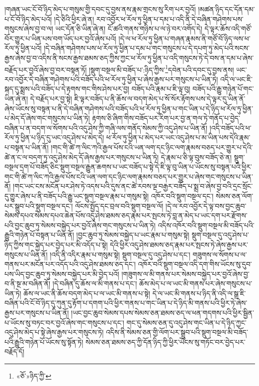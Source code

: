 །གཞན་ཡང་ངོ་བོ་ཉིད་མེད་པ་གསུམ་གྱི་དབང་དུ་བྱས་ནས་རྣམ་གྲངས་སུ་རིག་པར་བྱའོ། །མཚན་ཉིད་དང་དོན་དམ་པ་ངོ་བོ་ཉིད་མེད་པའོ། །དེ་ཅིའི་ཕྱིར་ཞེ་ན། རབ་འབྱོར་ཕ་རོལ་ཏུ་ཕྱིན་པ་དམ་པ་འདི་ནི་དེ་བཞིན་གཤེགས་པས་གསུངས་ཞེས་བྱ་བ་ལ། ཡང་དོན་ཅི་ཡིན་ཞེ་ན། ངོ་ཚའི་གནས་གཉིས་པ་ལ་ཉེ་བར་འགོད་དེ། དེ་ལྟར་ཆོས་འདི་གཙོ་བོར་གྱུར་པ་ཡིན་པས་བག་ཡོད་པར་བྱའོ་ཞེས་པའོ། །དེ་ལ་ཕ་རོལ་ཏུ་ཕྱིན་པ་གཞན་རྣམས་ནི་གཙོ་བོ་ཉིད་ལས་ཕ་རོལ་ཏུ་ཕྱིན་པའོ། །དེ་བཞིན་གཤེགས་པས་ཕ་རོལ་ཏུ་ཕྱིན་པ་དམ་པ་གང་གསུངས་པ་དེ་དཔག་ཏུ་མེད་པའི་སངས་རྒྱས་ཞེས་བྱ་བ་འདིས་ནི་སངས་རྒྱས་ཐམས་ཅད་ཀྱིས་ཀྱང་ཕ་རོལ་ཏུ་ཕྱིན་པ་འདི་གསུངས་ཏེ་དེ་བས་ན་དམ་པ་ཞེས་བརྗོད་པར་བྱའོ་ཞེས་བྱ་བར་བསྟན་ཏོ། །སྡུག་བསྔལ་མི་བཟོད་པ་:ཉིད་ཀྱིས་\footnote{«ཅོ་»ཉིད་ཀྱི་}དབེན་པའི་དབང་དུ་བྱས་ནས། ཡང་རབ་འབྱོར་དེ་བཞིན་གཤེགས་པའི་བཟོད་པའི་ཕ་རོལ་ཏུ་ཕྱིན་པ་ཞེས་རྒྱས་པར་གསུངས་པ་ཡིན་ཏེ། འདི་ལ་ཡང་ཇི་སྐད་དུ་སྨྲས་པའི་བཟོད་པ་དེ་རྟགས་གང་གིས་ཤེས་པར་བྱ། བཟོད་པའི་རྣམ་པ་ཇི་ལྟ་བུ། བཟོད་པའི་རྒྱུ་གཉེན་པོ་གང་ཡིན་ཞེ་ན། དེ་བརྗོད་པར་བྱ་སྟེ། ཇི་ལྟར་བཟོད་པ་ནི་ཆོས་ལ་བདག་མེད་པ་སོ་སོར་རྟོགས་པས་དེ་ལྟར་དུ་ཡིན་ནོ་ཞེས་ཡོངས་སུ་བསྟན་པ་ནི་དེ་བཞིན་གཤེགས་པའི་བཟོད་པའི་ཕ་རོལ་ཏུ་ཕྱིན་པ་གང་ཡིན་པ་དེ་ཉིད་ཕ་རོལ་ཏུ་ཕྱིན་པ་མེད་དོ་ཞེས་གང་གསུངས་པ་ཡིན་ཏེ། རྟགས་ཅི་ཞིག་གིས་བཟོད་པར་རིག་པར་བྱ་ན་གལ་ཏེ་གནོད་པ་བྱེད་བཞིན་པ་ན་བདག་ལ་སོགས་པའི་འདུ་ཤེས་ཀྱི་གཞི་ལས་གནོད་སེམས་ཀྱི་འདུ་ཤེས་པ་ཡིན་ནོ། །འདི་བཟོད་པའི་ཕ་རོལ་ཏུ་ཕྱིན་པ་ཉིད་དུ་ཡང་འདུ་ཤེས་པ་མེད་དེ། ཕ་རོལ་ཏུ་ཕྱིན་པ་མེད་པར་ཡང་འདུ་ཤེས་པ་མ་ཡིན་པས་དེའི་རྣམ་པ་བསྟན་པ་ཡིན་ནོ། །གང་གི་ཚེ་ཀ་ལིང་ཀའི་རྒྱལ་པོས་ངའི་ཡན་ལག་དང་ཉིང་ལག་རྣམས་བཅད་པར་གྱུར་པ་དེའི་ཚེ་ན་ང་ལ་བདག་ཏུ་འདུ་ཤེས་མེད་དོ་ཞེས་རྒྱས་པར་གསུངས་པ་ཡིན་ཏེ། དེ་རྣམ་པ་ཅི་ལྟ་བུས་བཟོད་ཅེ་ན། སྡུག་བསྔལ་དྲག་པོ་བཟོད་ཅིང་སྡུག་བསྔལ་རྒྱུན་ཆགས་པ་ཡང་བཟོད་པ་སྟེ་དེ་ཇི་ལྟ་བུ་ཡིན་པ་ཡོངས་སུ་བསྟན་པའི་ཕྱིར་གང་གི་ཚེ་ཀ་ལིང་ཀའི་རྒྱལ་པོས་ངའི་ཡན་ལག་དང་ཉིང་ལག་རྣམས་བཅད་པར་གྱུར་པ་ཞེས་གང་གསུངས་པ་ཡིན་ནོ། །གང་ཡང་ངས་མངོན་པར་ཤེས་ཏེ་འདས་པའི་དུས་ནང་ཚེ་རབས་ལྔ་བརྒྱར་བཟོད་པ་སྨྲ་བ་ཞེས་བྱ་བའི་དྲང་སྲོང་དུ་གྱུར་ཞེས་པ་ནི་བཟོད་པའི་རྒྱུ་ཡང་སྡུག་བསྔལ་རྣམ་པ་གསུམ་སྟེ། འཁོར་བའི་སྡུག་བསྔལ་དང་། སེམས་ཅན་ལོག་པར་སྒྲུབ་པའི་སྡུག་བསྔལ་དང་། ལོངས་སྤྱོད་དང་བྲལ་བའི་སྡུག་བསྔལ་ལོ། །དེ་ལ་རབ་འབྱོར་དེ་ལྟ་བས་བྱང་ཆུབ་སེམས་དཔའ་སེམས་དཔའ་ཆེན་པོས་འདུ་ཤེས་ཐམས་ཅད་རྣམ་པར་སྤངས་ཏེ་བླ་ན་མེད་པ་ཡང་དག་པར་རྫོགས་པའི་བྱང་ཆུབ་ཏུ་སེམས་བསྐྱེད་པར་བྱའོ་ཞེས་གང་གསུངས་པ་ཡིན་ཏེ། འདིས་འཁོར་བའི་སྡུག་བསྔལ་མི་བཟོད་པའི་རྒྱུའི་གཉེན་པོ་བསྟན་པ་ཡིན་ནོ། །བྱང་ཆུབ་ཏུ་སེམས་བསྐྱེད་པ་ཡང་རྣམ་པ་གསུམ་སྟེ། སྡུག་བསྔལ་དུ་འདུ་ཤེས་པ་ཉིད་ཀྱིས་གང་སྐྱེད་པར་བྱེད་པར་མི་འདོད་པ་སྟེ། དེའི་ཕྱིར་འདུ་ཤེས་ཐམས་ཅད་རྣམ་པར་སྤངས་ཏེ་ཞེས་རྒྱས་པར་གསུངས་པ་ཡིན་ནོ། །འདི་ནི་འདིར་རྣམ་པ་གསུམ་སྟེ། སྡུག་བསྔལ་དུ་འདུ་ཤེས་པ་དང་། གཟུགས་ལ་སོགས་པ་ལ་གནས་པར་མངོན་པར་འདོད་པའི་འདུ་ཤེས་ཐམས་ཅད་དང་། འཁོར་བའི་སྡུག་བསྔལ་འདི་དག་གིས་ཡོངས་སུ་དུབ་པས་ཡིད་བྱང་ཆུབ་ཏུ་སེམས་བསྐྱེད་པར་མི་བྱེད་པའོ། །གཟུགས་ལ་མི་གནས་པར་སེམས་བསྐྱེད་པར་བྱའོ་ཞེས་བྱ་བ་ནི་སྔ་མ་བཞིན་ནོ། །དེ་བཞིན་དུ་ཆོས་ལ་མི་གནས་པ་དང་། ཆོས་མེད་པ་ལ་ཡང་མི་གནས་པར་ཞེས་གསུངས་པ་ཡིན་ཏེ། ཆོས་ལ་ཡང་ནི་ཆོས་བདག་མེད་པ་ལ་ཡང་མི་གནས་པ་སྟེ། དེ་ལ་ཡང་མི་གནས་པ་ཉིད་ནི་འདི་ལ་སྒྲ་ཇི་བཞིན་པའི་ངོ་བོ་ཉིད་དུ་ཀུན་དུ་རྟོག་པ་དགག་པའི་ཕྱིར་གནས་པ་གང་ཡིན་པ་དེ་ཉིད་མི་གནས་པའི་ཕྱིར་ཏེ་ཞེས་རྒྱས་པར་གསུངས་པ་ཡིན་ནོ། །ཡང་བྱང་ཆུབ་སེམས་དཔས་སེམས་ཅན་ཐམས་ཅད་ལ་ཕན་གདགས་པའི་ཕྱིར་སྦྱིན་པ་ཡོངས་སུ་བཏང་བར་བྱའོ་ཞེས་གང་གསུངས་པ་དང་། གང་དུ་སེམས་ཅན་དུ་འདུ་ཤེས་གང་ཡིན་པ་དེ་ཉིད་ཀྱང་འདུ་ཤེས་མེད་པ་སྟེ་ཞེས་རྒྱས་པར་གསུངས་ཏེ། འདིས་ནི་སེམས་ཅན་གྱི་ལོག་པར་སྒྲུབ་པའི་སྡུག་བསྔལ་མི་བཟོད་པའི་རྒྱུའི་གཉེན་པོ་ཡོངས་སུ་སྟོན་ཏེ། སེམས་ཅན་ཐམས་ཅད་ཀྱི་དོན་ཉིད་ཀྱི་ཕྱིར་ཡོངས་སུ་གཏོང་བར་བྱེད་པར་བརྗོད་དོ། 